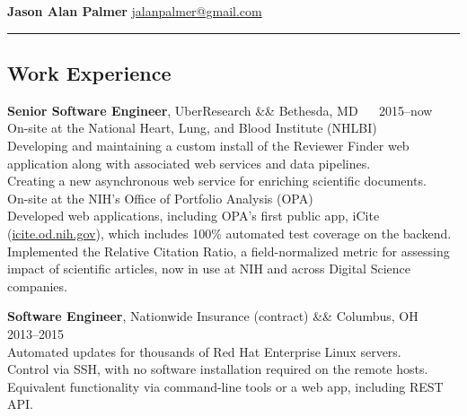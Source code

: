 \documentclass[12pt]{report}
\makeatletter
\renewcommand{\bullet}{$\vcenter{\hbox{~\huge$\cdot$~}}$}
\newenvironment{jobhead}
{\tabularx{\textwidth}{ @{} l X r @{} }}
{\endtabularx}
\newenvironment{bullets}
{\tabularx{\textwidth}{ @{\bullet} X @{} }}
{\endtabularx}
\makeatother
\begin{document}
\textbf{\large Jason Alan Palmer} \hfill \href{mailto:jalanpalmer@gmail.com}{jalanpalmer@gmail.com}

\rule{\textwidth}{1pt}

\subsection*{Work Experience}

\begin{jobhead}
\textbf{Senior Software Engineer}, UberResearch && Bethesda, MD ~~ 2015--now \\
\end{jobhead}
On-site at the National Heart, Lung, and Blood Institute (NHLBI) \\
\begin{bullets}
Developing and maintaining a custom install of the Reviewer Finder web application along with associated web services and data pipelines. \\
Creating a new asynchronous web service for enriching scientific documents. \\
\end{bullets}
On-site at the NIH's Office of Portfolio Analysis (OPA) \\
\begin{bullets}
Developed web applications, including OPA's first public app, iCite (\href{https://icite.od.nih.gov}{icite.od.nih.gov}), which includes 100\% automated test coverage on the backend. \\
Implemented the Relative Citation Ratio, a field-normalized metric for assessing impact of scientific articles, now in use at NIH and across Digital Science companies. \\
\end{bullets}

\begin{jobhead}
\textbf{Software Engineer}, Nationwide Insurance (contract) && Columbus, OH ~~ 2013--2015 \\
\end{jobhead}
\begin{bullets}
Automated updates for thousands of Red Hat Enterprise Linux servers. \\
Control via SSH, with no software installation required on the remote hosts. \\
Equivalent functionality via command-line tools or a web app, including REST API. \\
\end{bullets}
\end{document}
